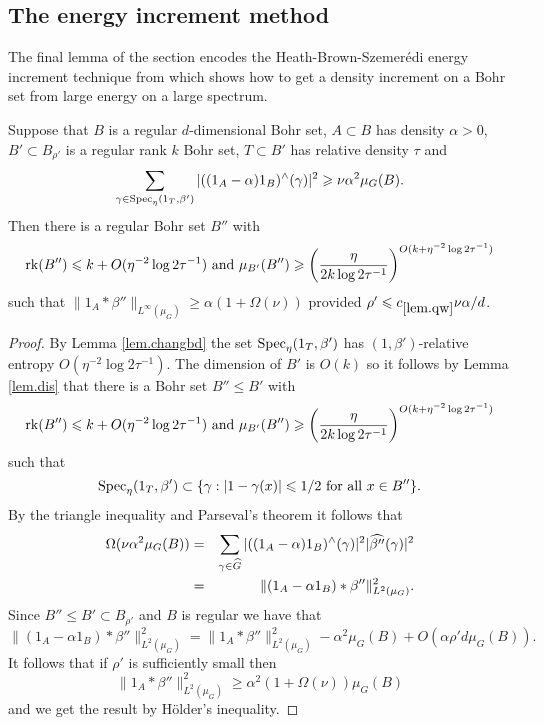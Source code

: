 \documentclass[12pt]{amsart}  %
\begin{document}
\subsection{The energy increment method}  The final lemma of the section encodes the Heath-Brown-Szemer{\'e}di energy increment technique from \cite{hea::,sze::2} which shows how to get a density increment on a Bohr set from large energy on a large spectrum.
\begin{lemma}\label{lem.qw}
Suppose that $B$ is a regular $d$-dimensional Bohr set, $A \subset B$ has density $\alpha>0$, $B'\subset B_{\rho'}$ is a regular rank $k$ Bohr set, $T \subset B'$ has relative density $\tau$ and
\begin{equation*}
\sum_{\gamma \in\Spec_\eta(1_T,\beta')}{|((1_A-\alpha)1_B)^\wedge(\gamma)|^2} \geq \nu \alpha^2\mu_G(B).
\end{equation*}
Then there is a regular Bohr set $B''$ with
\begin{equation*}
\rk(B'') \leq k+ O(\eta^{-2}\log 2\tau^{-1}) \textrm{ and } \mu_{B'}(B'') \geq \left(\frac{\eta}{2k\log 2\tau^{-1}}\right)^{O(k+\eta^{-2}\log2\tau^{-1})}
\end{equation*}
such that $\|1_A \ast \beta''\|_{L^\infty(\mu_G)} \geq \alpha (1+\Omega(\nu))$ provided ${\rho'} \leq c_{\ref{lem.qw}}\nu\alpha/d$.
\end{lemma}
\begin{proof} By Lemma \ref{lem.changbd} the set $\Spec_\eta(1_T,\beta')$ has $(1,\beta')$-relative entropy $O(\eta^{-2}\log 2\tau^{-1})$.  The dimension of $B'$ is $O(k)$ so it follows by Lemma \ref{lem.dis} that there is a Bohr set $B'' \leq B'$ with
\begin{equation*}
\rk(B'') \leq k +O(\eta^{-2}\log 2\tau^{-1}) \textrm{ and } \mu_{B'}(B'') \geq \left(\frac{\eta}{2k\log 2\tau^{-1}}\right)^{O(k+\eta^{-2}\log2\tau^{-1})}
\end{equation*}
such that
\begin{equation*}
\Spec_\eta(1_T,\beta') \subset \{\gamma: |1-\gamma(x)| \leq 1/2 \textrm{ for all } x \in B''\}.
\end{equation*}
By the triangle inequality and Parseval's theorem it follows that
\begin{eqnarray*}
\Omega(\nu \alpha^2\mu_G(B)) & = &\sum_{\gamma \in\wh{G}}{|((1_A-\alpha)1_B)^\wedge(\gamma)|^2|\wh{\beta''}(\gamma)|^2}\\ & = & \|(1_A - \alpha1_B)\ast \beta''\|_{L^2(\mu_G)}^2.
\end{eqnarray*}
Since $B'' \leq B' \subset B_{\rho'}$ and $B$ is regular we have that
\begin{equation*}
\|(1_A - \alpha1_B)\ast \beta''\|_{L^2(\mu_G)}^2 = \|1_A \ast \beta''\|_{L^2(\mu_G)}^2 -\alpha^2\mu_G(B) + O(\alpha {\rho'} d\mu_G(B)).
\end{equation*}
It follows that if ${\rho'}$ is sufficiently small then
\begin{equation*}
 \|1_A \ast \beta''\|_{L^2(\mu_G)}^2\geq \alpha^2(1+\Omega(\nu))\mu_G(B)
\end{equation*}
and we get the result by H{\"o}lder's inequality.
\end{proof}
\end{document}
